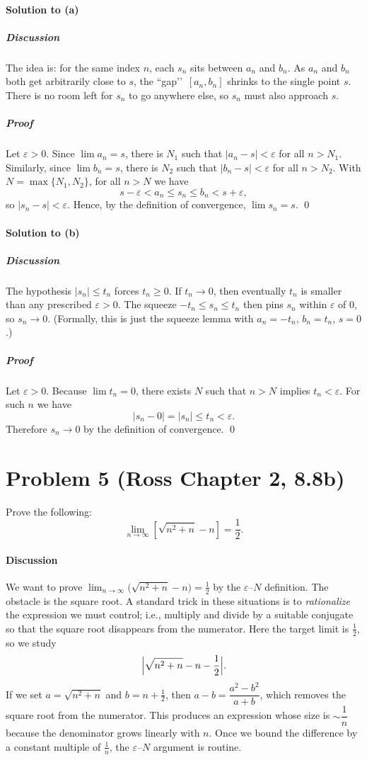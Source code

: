 \documentclass[12pt]{article}
\begin{document}
\paragraph{Solution to (a)}
\subparagraph{Discussion}
The idea is: for the same index $n$, each $s_n$ sits between $a_n$ and $b_n$.  
As $a_n$ and $b_n$ both get arbitrarily close to $s$, the “gap’’ \,$[a_n,b_n]$ shrinks to the single
point $s$. There is no room left for $s_n$ to go anywhere else, so $s_n$ must also approach $s$.

\subparagraph{Proof}
Let $\varepsilon>0$. Since $\lim a_n=s$, there is $N_1$ such that $|a_n-s|<\varepsilon$ for all $n>N_1$.
Similarly, since $\lim b_n=s$, there is $N_2$ such that $|b_n-s|<\varepsilon$ for all $n>N_2$.
With $N=\max\{N_1,N_2\}$, for all $n>N$ we have
\[
s-\varepsilon<a_n\le s_n\le b_n<s+\varepsilon,
\]
so $|s_n-s|<\varepsilon$. Hence, by the definition of convergence, $\lim s_n=s$.
\qed

\paragraph{Solution to (b)}
\subparagraph{Discussion}
The hypothesis $|s_n|\le t_n$ forces $t_n\ge0$. If $t_n\to0$, then eventually $t_n$ is smaller than any
prescribed $\varepsilon>0$. The squeeze $-t_n\le s_n\le t_n$ then pins $s_n$ within $\varepsilon$ of $0$,
so $s_n\to0$. (Formally, this is just the squeeze lemma with $a_n=-t_n$, $b_n=t_n$, $s=0$.)

\subparagraph{Proof}
Let $\varepsilon>0$. Because $\lim t_n=0$, there exists $N$ such that $n>N$ implies $t_n<\varepsilon$.
For such $n$ we have
\[
|s_n-0|=|s_n|\le t_n<\varepsilon.
\]
Therefore $s_n\to0$ by the definition of convergence.  \qed


\section*{Problem 5 (Ross Chapter 2, 8.8b)}
Prove the following:
\[
\lim_{n \to \infty} [\sqrt{n^2 + n} - n] = \frac{1}{2}.
\]
\paragraph{Discussion}
We want to prove $\displaystyle\lim_{n\to\infty}\bigl(\sqrt{n^2+n}-n\bigr)=\tfrac12$ by the
$\varepsilon$–$N$ definition. The obstacle is the square root.
A standard trick in these situations is to \emph{rationalize} the
expression we must control; i.e., multiply and divide by a suitable
conjugate so that the square root disappears from the numerator.
Here the target limit is $\tfrac12$, so we study
\[
\Bigl|\sqrt{n^2+n}-n-\frac12\Bigr|.
\]
If we set $a=\sqrt{n^2+n}$ and $b=n+\tfrac12$, then
$a-b=\dfrac{a^2-b^2}{a+b}$, which removes the square root from the
numerator. This produces an expression whose size is $\sim\! \dfrac{1}{n}$
because the denominator grows linearly with $n$. Once we bound the
difference by a constant multiple of $\tfrac{1}{n}$, the
$\varepsilon$–$N$ argument is routine.
\end{document}
